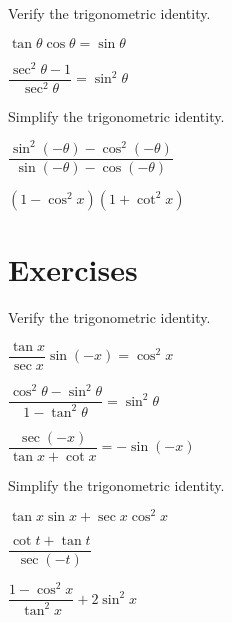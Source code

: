 \begin{exercise}
  Verify the trigonometric identity.\\
  \begin{enumerate*}
    \item $\tan \theta \cos \theta=\sin \theta$
    \item $\dfrac{{\sec}^2 \theta-1}{{\sec}^2 \theta}={\sin}^2 \theta$\hfill\null
  \end{enumerate*}
\end{exercise}

\begin{exercise}
 Simplify the trigonometric identity.\\
  \begin{enumerate*}
    \item $\dfrac{{\sin}^2(-\theta)-{\cos}^2(-\theta)}{\sin(-\theta)-\cos(-\theta)}$
    \item $(1-{\cos}^2 x)(1+{\cot}^2 x)$\hfill\null
  \end{enumerate*}
\end{exercise}

\newpage
\section*{Exercises}

\begin{exercise}
  Verify the trigonometric identity.\\
  \begin{enumerate*}
    \item $\dfrac{\tan x}{\sec x}\sin (-x)=\cos ^2x$
    \item $\dfrac{\cos ^2 \theta -\sin ^2 \theta }{1-\tan ^2 \theta }=\sin ^2 \theta$
    \item $\dfrac{\sec (-x)}{\tan x+\cot x}=-\sin (-x)$\hfill\null
  \end{enumerate*}
\end{exercise}
\begin{exercise}
  Simplify the trigonometric identity.\\
  \begin{enumerate*}
    \item $\tan x\sin x+\sec x\cos^2x$
    \item $\dfrac{\cot t+\tan t}{\sec (-t)}$
    \item $\dfrac{1-\cos ^2 x}{\tan ^2 x}+2\sin ^2 x$\hfill\null
  \end{enumerate*}
\end{exercise}

